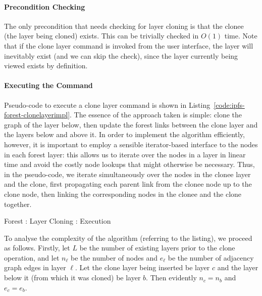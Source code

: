 
\paragraph{Precondition Checking}

The only precondition that needs checking for layer cloning is that the clonee (the layer being cloned) exists. This can be trivially checked in $O(1)$ time. Note that if the clone layer command is invoked from the user interface, the layer will inevitably exist (and we can skip the check), since the layer currently being viewed exists by definition.

\paragraph{Executing the Command}

Pseudo-code to execute a clone layer command is shown in Listing~\ref{code:ipfs-forest-clonelayerimpl}. The essence of the approach taken is simple: clone the graph of the layer below, then update the forest links between the clone layer and the layers below and above it. In order to implement the algorithm efficiently, however, it is important to employ a sensible iterator-based interface to the nodes in each forest layer: this allows us to iterate over the nodes in a layer in linear time and avoid the costly node lookups that might otherwise be necessary. Thus, in the pseudo-code, we iterate simultaneously over the nodes in the clonee layer and the clone, first propagating each parent link from the clonee node up to the clone node, then linking the corresponding nodes in the clonee and the clone together.

\begin{stulisting}[!t]
\caption{Forest : Layer Cloning : Execution}
\label{code:ipfs-forest-clonelayerimpl}

\end{stulisting}

To analyse the complexity of the algorithm (referring to the listing), we proceed as follows. Firstly, let $L$ be the number of existing layers prior to the clone operation, and let $n_\ell$ be the number of nodes and $e_\ell$ be the number of adjacency graph edges in layer $\ell$. Let the clone layer being inserted be layer $c$ and the layer below it (from which it was cloned) be layer $b$. Then evidently $n_c = n_b$ and $e_c = e_b$.

